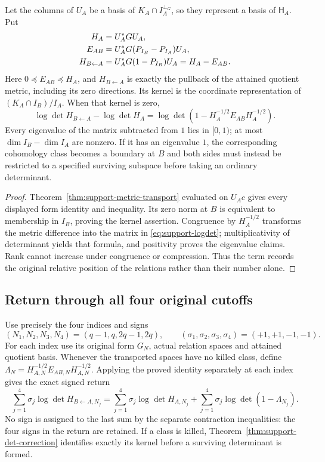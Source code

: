 \begin{theorem}\label{thm:support-det-correction}
Let the columns of $U_A$ be a basis of $K_A\cap I_A^{\perp_G}$, so they represent a basis of $\mathsf H_A$. Put
\begin{align}
 H_A&=U_A^*GU_A,\notag\\
 E_{AB}&=U_A^*G(P_{I_B}-P_{I_A})U_A,\notag\\
 H_{B\leftarrow A}&=U_A^*G(1-P_{I_B})U_A=H_A-E_{AB}.
 \label{eq:support-metric-matrices}
\end{align}
Here $0\preceq E_{AB}\preceq H_A$, and $H_{B\leftarrow A}$ is exactly the pullback of the attained quotient metric, including its zero directions. Its kernel is the coordinate representation of $(K_A\cap I_B)/I_A$. When that kernel is zero,
\begin{equation}\label{eq:support-logdet}
 \log\det H_{B\leftarrow A}-\log\det H_A
 =\log\det\left(1-H_A^{-1/2}E_{AB}H_A^{-1/2}\right).
\end{equation}
Every eigenvalue of the matrix subtracted from $1$ lies in $[0,1)$; at most $\dim I_B-\dim I_A$ are nonzero. If it has an eigenvalue $1$, the corresponding cohomology class becomes a boundary at $B$ and both sides must instead be restricted to a specified surviving subspace before taking an ordinary determinant.
\end{theorem}
\begin{proof}
Theorem~\ref{thm:support-metric-transport} evaluated on $U_Ac$ gives every displayed form identity and inequality. Its zero norm at $B$ is equivalent to membership in $I_B$, proving the kernel assertion. Congruence by $H_A^{-1/2}$ transforms the metric difference into the matrix in \eqref{eq:support-logdet}; multiplicativity of determinant yields that formula, and positivity proves the eigenvalue claims. Rank cannot increase under congruence or compression. Thus the term records the original relative position of the relations rather than their number alone.
\end{proof}

\subsection{Return through all four original cutoffs}
Use precisely the four indices and signs
\[
 (N_1,N_2,N_3,N_4)=(q-1,q,2q-1,2q),\qquad
 (\sigma_1,\sigma_2,\sigma_3,\sigma_4)=(+1,+1,-1,-1).
\]
For each index use its original form $G_N$, actual relation spaces and attained quotient basis. Whenever the transported spaces have no killed class, define
$\Lambda_N=H_{A,N}^{-1/2}E_{AB,N}H_{A,N}^{-1/2}$. Applying the proved identity separately at each index gives the exact signed return
\begin{equation}\label{eq:all-four-support-return}
 \sum_{j=1}^4\sigma_j\log\det H_{B\leftarrow A,N_j}
 =\sum_{j=1}^4\sigma_j\log\det H_{A,N_j}
  +\sum_{j=1}^4\sigma_j\log\det(1-\Lambda_{N_j}).
\end{equation}
No sign is assigned to the last sum by the separate contraction inequalities: the four signs in the return are retained. If a class is killed, Theorem~\ref{thm:support-det-correction} identifies exactly its kernel before a surviving determinant is formed.

